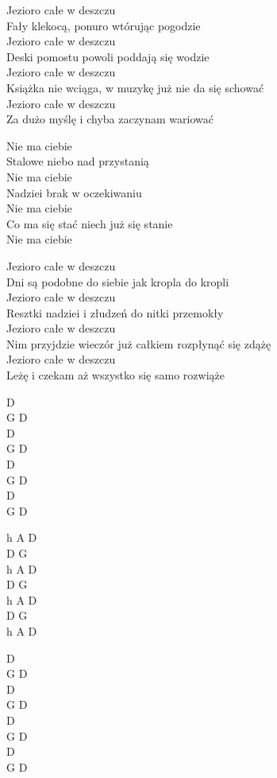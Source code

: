 \begin{text}
Jezioro całe w deszczu\\
Fały klekocą, ponuro wtórując pogodzie\\
Jezioro całe w deszczu\\
Deski pomostu powoli poddają się wodzie\\
Jezioro całe w deszczu\\
Książka nie wciąga, w muzykę już nie da się schować\\
Jezioro całe w deszczu\\
Za dużo myślę i chyba zaczynam wariować

\vin Nie ma ciebie\\
\vin Stalowe niebo nad przystanią\\
\vin Nie ma ciebie\\
\vin Nadziei brak w oczekiwaniu\\
\vin Nie ma ciebie\\
\vin Co ma się stać niech już się stanie\\
\vin Nie ma ciebie

Jezioro całe w deszczu\\
Dni są podobne do siebie jak kropla do kropli\\
Jezioro całe w deszczu\\
Resztki nadziei i złudzeń do nitki przemokły\\
Jezioro całe w deszczu\\
Nim przyjdzie wieczór już całkiem rozpłynąć się zdążę\\
Jezioro całe w deszczu\\
Leżę i czekam aż wszystko się samo rozwiąże
\end{text}
\begin{chord}
    D\\
    G D\\
    D\\
    G D\\
    D\\
    G D\\
    D\\
    G D

    h A D\\
    D G\\
    h A D\\
    D G\\
    h A D\\
    D G\\
    h A D

    D\\
    G D\\
    D\\
    G D\\
    D\\
    G D\\
    D\\
    G D
\end{chord}